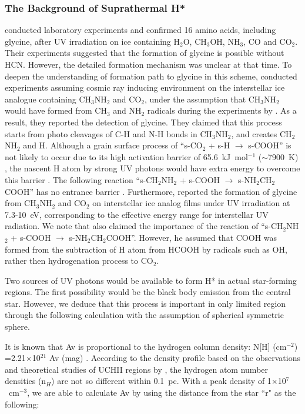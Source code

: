 \documentclass{aastex61}
\begin{document}
\subsubsection{The Background of Suprathermal H*}
\cite{Munoz02} conducted laboratory experiments and confirmed 16 amino acids, including glycine, after UV irradiation on ice containing H$_2$O, CH$_3$OH, NH$_3$, CO and CO$_2$.
%
Their experiments suggested that the formation of glycine is possible without HCN.
%
However, the detailed formation mechanism was unclear at that time.
%
To deepen the understanding of formation path to glycine in this scheme, \cite{Holtom05} conducted experiments assuming cosmic ray inducing environment on the interstellar ice analogue containing CH$_3$NH$_2$ and CO$_2$, under the assumption that CH$_3$NH$_2$ would have formed from CH$_3$ and NH$_2$ radicals during the experiments by \cite{Munoz02}.
%
As a result, they reported the detection of glycine.
%
They claimed that this process starts from photo cleavages of C-H and N-H bonds in CH$_3$NH$_2$, and creates CH$_2$NH$_2$ and H.
%
Although a grain surface process of ``s-CO$_2$ + s-H $\longrightarrow$ s-COOH'' is not likely to occur due to its high activation barrier of 65.6~kJ~mol$^{-1}$ ($\sim$7900~K) \citep{Zhu01}, the nascent H atom by strong UV photons would have extra energy to overcome this barrier \citep{Holtom05,Lee09}.
%
The following reaction ``s-CH$_2$NH$_2$ + s-COOH $\longrightarrow$ s-NH$_2$CH$_2$COOH'' has no entrance barrier \citep{Holtom05}.
%
Furthermore, \cite{Lee09} reported the formation of glycine from CH$_3$NH$_2$ and CO$_2$ on interstellar ice analog films under UV irradiation at 7.3-10~eV, corresponding to the effective energy range for interstellar UV radiation. 
%
We note that \cite{Garrod13} also claimed the importance of the reaction of ``s-CH$_2$NH$_2$ + s-COOH $\longrightarrow$ s-NH$_2$CH$_2$COOH''.
%
However, he assumed that COOH was formed from the subtraction of H atom from HCOOH by radicals such as OH, rather then hydrogenation process to CO$_2$.
%


Two sources of UV photons would be available to form H* in actual star-forming regions.
%
The first possibility would be the black body emission from the central star.
%
However, we deduce that this process is important in only limited region through the following calculation with the assumption of spherical symmetric sphere.
%

It is known that Av is proportional to the hydrogen column density: N[H] (cm$^{-2}$) =2.21$\times$10$^{21}$ Av (mag) \citep{Guver09}.
%
According to the density profile based on the observations and theoretical studies of UCHI\hspace*{-1pt}I regions by \cite{Nomura04}, the hydrogen atom number densities (n$_H$) are not so different within 0.1~pc.
%
With a peak density of 1$\times$10$^7$~cm$^{-3}$, we are able to calculate Av by using the distance from the star ``r" as the following:
\end{document}
